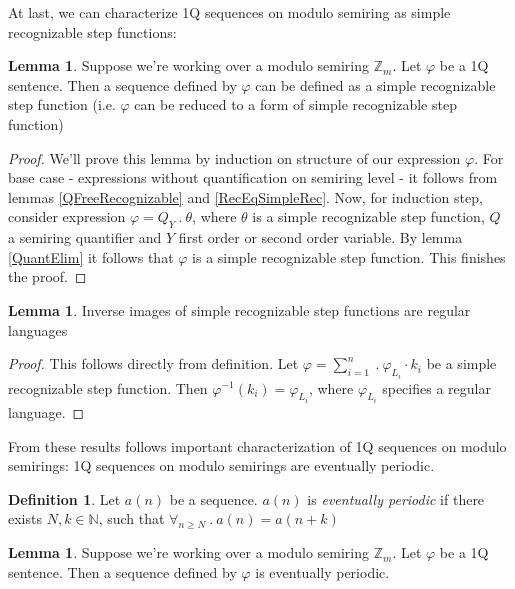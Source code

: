 \documentclass[12pt]{article}
\theoremstyle{definition}
\newtheorem{definition}{Definition}[section]
\newtheorem{lemma}[theorem]{Lemma}
\begin{document}
At last, we can characterize 1Q sequences on modulo semiring as simple recognizable step functions:

\begin{lemma}
    \label{OverModAreSimpleRec}
    Suppose we're working over a modulo semiring $\mathbb{Z}_m$. Let $\varphi$ be a 1Q sentence. Then a sequence defined by $\varphi$ can be defined as a simple recognizable step function (i.e. $\varphi$ can be reduced to a form of simple recognizable step function) 
\end{lemma}

\begin{proof}
    We'll prove this lemma by induction on structure of our expression $\varphi$. For base case - expressions without quantification on semiring level - it follows from lemmas \ref{QFreeRecognizable} and \ref{RecEqSimpleRec}. Now, for induction step, consider expression $\varphi = Q_Y \ . \ \theta$, where $\theta$ is a simple recognizable step function, $Q$ a semiring quantifier and $Y$ first order or second order variable. By lemma \ref{QuantElim} it follows that $\varphi$ is a simple recognizable step function. This finishes the proof.
\end{proof}

\begin{lemma}
    \label{InvAreReg}
    Inverse images of simple recognizable step functions are regular languages
\end{lemma}

\begin{proof}
    This follows directly from definition. Let $\varphi = \sum_{i = 1}^{n} \ . \ \varphi_{L_i} \cdot k_i$ be a simple recognizable step function. Then $\varphi^{-1}(k_i) = \varphi_{L_i}$, where $\varphi_{L_i}$ specifies a regular language.
\end{proof}

From these results follows important characterization of 1Q sequences on modulo semirings: 1Q sequences on modulo semirings are eventually periodic.

\begin{definition}
    Let $a(n)$ be a sequence. $a(n)$ is \textit{eventually periodic} if there exists $N, k \in \mathbb{N}$, such that $\forall_{n \geq N} \ . \ a(n) = a(n+k)$
\end{definition}

\begin{lemma}
    \label{OverModAreSimpleRec2}
    Suppose we're working over a modulo semiring $\mathbb{Z}_m$. Let $\varphi$ be a 1Q sentence. Then a sequence defined by $\varphi$ is eventually periodic.
\end{lemma}
\end{document}
